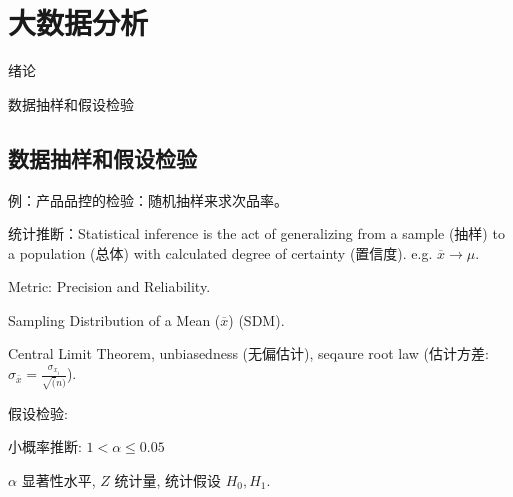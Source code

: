 \chapter{大数据分析}
\label{chap:big_data_analysis}


\begin{learningobjectives}
	\item 绪论
	\item 数据抽样和假设检验
\end{learningobjectives}


\section{数据抽样和假设检验}

例：产品品控的检验：随机抽样来求次品率。

统计推断：Statistical inference is the act of generalizing from a sample (抽样) to a population (总体) with calculated degree of certainty (置信度).
e.g. $\overline{x} \rightarrow \mu$.

Metric: Precision and Reliability.

Sampling Distribution of a Mean ($\overline{x}$) (SDM).

Central Limit Theorem, unbiasedness (无偏估计), seqaure root law (估计方差: $\sigma_{\overline{x}} = \frac{\sigma_{x_i}}{\sqrt(n)}$).

假设检验:

小概率推断: $1 < \alpha \le 0.05$

$\alpha$ 显著性水平, $Z$ 统计量, 统计假设 $H_0,H_1$.
